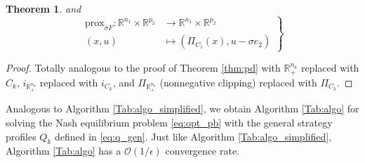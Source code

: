 \documentclass{article} %
\newtheorem{theorem}{Theorem} \newtheorem{lemma}[theorem]{Lemma}
\begin{document}
\begin{theorem}
  and
  \begin{equation}
    \left .
    \begin{split}
      \text{prox}_{\sigma F}: \mathbb{R}^{n_1} \times \mathbb{R}^{p_2} &\rightarrow \mathbb{R}^{n_1} \times \mathbb{R}^{p_2}\\
      (x, u) &\mapsto (\Pi_{C_1}(x), u - \sigma e_2)
    \end{split}
    \right\}
  \end{equation}
  \label{thm:pd_gen}
\end{theorem}

\begin{proof}
Totally analogous to the proof of Theorem \ref{thm:pd} with $\mathbb{R}^{n_k}_+$ replaced with $C_k$,
$i_{\mathbb{R}^{n_k}_+}$ replaced with $i_{C_k}$, and $\Pi_{\mathbb{R}^{n_k}_+}$ (nonnegative clipping) replaced with $\Pi_{C_k}$.
\end{proof}

Analogous to Algorithm \ref{Tab:algo_simplified}, we obtain Algorithm \ref{Tab:algo} for solving the Nash equilibrium problem \ref{eq:opt_pb} with the general strategy profiles $Q_k$ defined in \eqref{eq:q_gen}. Just like Algorithm \ref{Tab:algo_simplified}, Algorithm \ref{Tab:algo} has a $\mathcal{O}(1/\epsilon)$ convergence rate.
\end{document}
